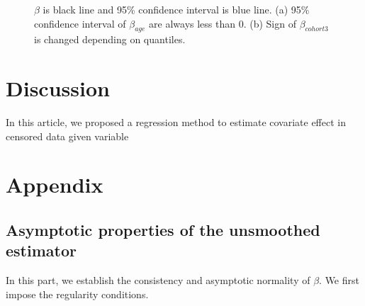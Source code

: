 \documentclass[titlepage,english,12pt]{article}
\begin{document}
	\begin{figure}[htp] \label{figure:1}
		\centering
		\caption{
			$\beta$ is black line and 95\% confidence interval is blue line.
			(a) 95\% confidence interval of $\beta_{age}$ are always less than 0. 
			(b) Sign of $\beta_{cohort3}$ is changed depending on quantiles. 
			}
	\end{figure}


\section{Discussion}
	In this article, we proposed a regression method to estimate covariate effect in censored data given variable 


\section{Appendix}


\subsection{Asymptotic properties of the unsmoothed estimator}
	\noindent In this part, we establish the consistency and asymptotic normality of $\beta$. We first impose the regularity conditions.
	
\end{document}
